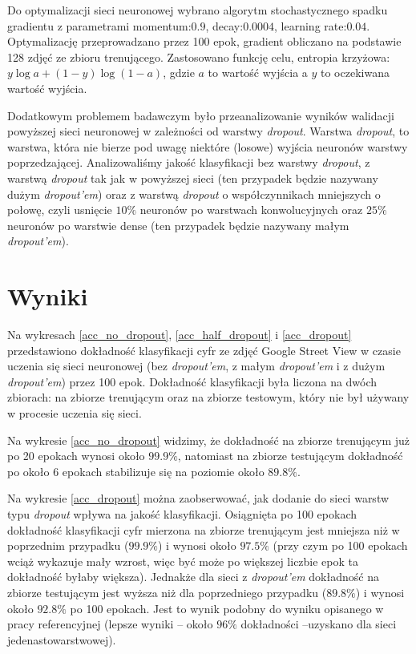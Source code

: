 \documentclass[12pt]{article}
\begin{document}
Do optymalizacji sieci neuronowej wybrano algorytm stochastycznego spadku gradientu z parametrami momentum:$0.9$, decay:$0.0004$, learning rate:$0.04$. Optymalizację przeprowadzano przez 100 epok, gradient obliczano na podstawie 128 zdjęć ze zbioru trenującego. Zastosowano funkcję celu, entropia krzyżowa: $y\log a + (1-y)\log(1-a)$, gdzie $a$ to wartość wyjścia a $y$ to oczekiwana wartość wyjścia.

Dodatkowym problemem badawczym było przeanalizowanie wyników walidacji powyższej sieci neuronowej w zależności od warstwy \textit{dropout}. Warstwa \textit{dropout}, to warstwa, która nie bierze pod uwagę niektóre (losowe) wyjścia neuronów warstwy poprzedzającej. Analizowaliśmy jakość klasyfikacji bez warstwy \textit{dropout}, z warstwą \textit{dropout} tak jak w powyższej sieci (ten przypadek będzie nazywany dużym \textit{dropout'em}) oraz z warstwą \textit{dropout} o współczynnikach mniejszych o połowę, czyli usnięcie $10\%$ neuronów po warstwach konwolucyjnych oraz $25\%$ neuronów po warstwie dense (ten przypadek będzie nazywany małym \textit{dropout'em}).

\section{Wyniki}

Na wykresach \ref{acc_no_dropout}, \ref{acc_half_dropout} i \ref{acc_dropout} przedstawiono dokładność klasyfikacji cyfr ze zdjęć Google Street View w czasie uczenia się sieci neuronowej (bez \textit{dropout'em}, z małym \textit{dropout'em} i z dużym \textit{dropout'em}) przez 100 epok. Dokładność klasyfikacji była liczona na dwóch zbiorach: na zbiorze trenującym oraz na zbiorze testowym, który nie był używany w procesie uczenia się sieci.

Na wykresie \ref{acc_no_dropout} widzimy, że dokładność na zbiorze trenującym już po 20 epokach wynosi około $99.9\%$, natomiast na zbiorze testującym dokładność po około 6 epokach stabilizuje się na poziomie około $89.8\%$.

Na wykresie \ref{acc_dropout} można zaobserwować, jak dodanie do sieci warstw typu \textit{dropout} wpływa na jakość klasyfikacji. Osiągnięta po 100 epokach dokładność klasyfikacji cyfr mierzona na zbiorze trenującym jest mniejsza niż w poprzednim przypadku ($99.9\%$) i wynosi około $97.5\%$ (przy czym po 100 epokach wciąż wykazuje mały wzrost, więc być może po większej liczbie epok ta dokładność byłaby większa). Jednakże dla sieci z \textit{dropout'em} dokładność na zbiorze testującym jest wyższa niż dla poprzedniego przypadku ($89.8\%$) i wynosi około $92.8\%$ po 100 epokach. Jest to wynik podobny do wyniku opisanego w pracy referencyjnej \cite{reference-paper} (lepsze wyniki -- około $96\%$ dokładności --uzyskano dla sieci jedenastowarstwowej).
\end{document}

